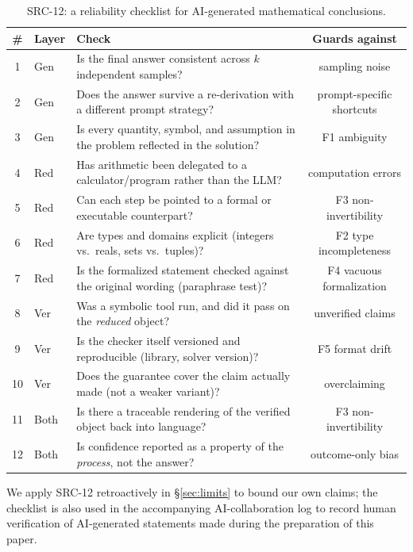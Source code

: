 \documentclass[11pt,a4paper]{article}
\begin{document}
\begin{table}[h]
\centering\small
\caption{SRC-12: a reliability checklist for AI-generated mathematical conclusions.}
\label{tab:checklist}
\begin{tabular}{@{}clp{4.1cm}c@{}}
\toprule
\# & Layer & Check & Guards against \\
\midrule
1 & Gen & Is the final answer consistent across $k$ independent samples? & sampling noise \\
2 & Gen & Does the answer survive a re-derivation with a different prompt strategy? & prompt-specific shortcuts \\
3 & Gen & Is every quantity, symbol, and assumption in the problem reflected in the solution? & F1 ambiguity \\
4 & Red & Has arithmetic been delegated to a calculator/program rather than the LLM? & computation errors \citep{gao2023pal,chen2023pot} \\
5 & Red & Can each step be pointed to a formal or executable counterpart? & F3 non-invertibility \\
6 & Red & Are types and domains explicit (integers vs.\ reals, sets vs.\ tuples)? & F2 type incompleteness \\
7 & Red & Is the formalized statement checked against the original wording (paraphrase test)? & F4 vacuous formalization \\
8 & Ver & Was a symbolic tool run, and did it pass on the \emph{reduced} object? & unverified claims \\
9 & Ver & Is the checker itself versioned and reproducible (library, solver version)? & F5 format drift \citep{yang2023leandojo} \\
10 & Ver & Does the guarantee cover the claim actually made (not a weaker variant)? & overclaiming \\
11 & Both & Is there a traceable rendering of the verified object back into language? & F3 non-invertibility \\
12 & Both & Is confidence reported as a property of the \emph{process}, not the answer? & outcome-only bias \citep{uesato2022feedback} \\
\bottomrule
\end{tabular}
\end{table}

We apply SRC-12 retroactively in \S\ref{sec:limits} to bound our own claims; the checklist is also used in the accompanying AI-collaboration log to record human verification of AI-generated statements made during the preparation of this paper.
\end{document}
